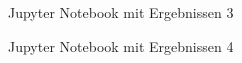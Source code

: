 \documentclass[a4paper]{report}
\begin{document}
\begin{figure}[H]
\centering
{}
\caption{Jupyter Notebook mit Ergebnissen 3}
\label{fig:Notebook3}
\end{figure}

\begin{figure}[H]
\centering
{}
\caption{Jupyter Notebook mit Ergebnissen 4}
\label{fig:Notebook4}
\end{figure}
\end{document}
